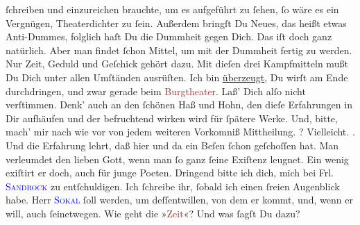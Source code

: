                ſchreiben und einzureichen brauchte, um es aufgeführt zu ſehen, ſo wäre es ein
               Vergnügen, Theaterdichter zu ſein. Außerdem bringſt Du Neues, das heißt etwas
               Anti-Dummes, folglich haſt Du die Dummheit gegen Dich. Das iſt doch ganz natürlich.
               Aber man findet ſchon Mittel, {\pb}um mit der Dummheit
               fertig zu werden. Nur Zeit, Geduld und Geſchick gehört dazu. Mit dieſen drei
               Kampfmitteln \strikeout{\textcolor{gray}{we}} mußt Du Dich unter allen Umſtänden ausrüſten. Ich bin \uline{überzeugt}, Du wirſt am Ende durchdringen, und zwar gerade beim \textcolor{brown}{Burgtheater}{}\ledrightnote{\textcolor{brown}{Burgtheater}}. Laß’ Dich alſo nicht verſtimmen.
               Denk’ auch an den ſchönen Haß und Hohn, den dieſe Erfahrungen in Dir aufhäufen und
               der befruchtend wirken wird für  ſpätere Werke.
               Und, bitte, mach’ mir nach wie vor von jedem weiteren Vorkomniß Mittheilung. \label{K_L02622_6v}\label{K_L02622_6h}? {\pb}Vielleicht. \label{K_L02622_7v}\label{K_L02622_7h}. Und die Erfahrung lehrt, daß
               hier und da ein Beſen ſchon geſchoſſen hat. Man 
               verleumdet den lieben Gott, wenn man ſo ganz ſeine Exiſtenz leugnet. Ein wenig
               exiſtirt er doch, auch für junge Poeten.\pend
           \pstart
           Dringend bitte ich dich, mich bei Frl. \textsc{\textcolor{blue}{Sandrock}{}\ledrightnote{\textcolor{blue}{Adele Sandrock}}} zu entſchuldigen. Ich ſchreibe ihr, ſobald ich einen ſreien Augenblick
               habe.\pend
           \pstart
           Herr \textsc{\textcolor{blue}{Sokal}{}\ledrightnote{\textcolor{blue}{Clemens Sokal}}} ſoll \label{K_L02622_8v}\label{K_L02622_8h} werden, {\pb}um deſſentwillen, von dem er kommt, und, wenn er
               will, auch ſeinetwegen.\pend
           \pstart
           Wie geht die »\textcolor{brown}{Zeit}{}\ledrightnote{\textcolor{brown}{Die Zeit. Wiener Wochenschrift}}«? Und was ſagſt Du dazu?\pend

